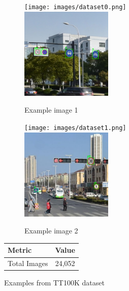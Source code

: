 \documentclass[10pt]{article}
\begin{document}
\begin{figure}[H]
    \centering
    \begin{minipage}{0.45\textwidth}
        \begin{subfigure}{\textwidth}
            \centering
            \texttt{[image: images/dataset0.png]}
            \includegraphics[width=0.48\textwidth]{images/dataset0-enlarged.png}
            \caption{Example image 1}
        \end{subfigure}
        \vspace{0.2cm}
        \begin{subfigure}{\textwidth}
            \centering
            \texttt{[image: images/dataset1.png]}
            \includegraphics[width=0.48\textwidth]{images/dataset1-enlarged.png}
            \caption{Example image 2}
        \end{subfigure}
        \caption{Examples from TT100K dataset}
        \label{fig:examples}
    \end{minipage}
    \hfill
    \begin{minipage}{0.5\textwidth}
        \centering
        \begin{tabular}{lc}
            \toprule
            Metric & Value \\
            \midrule
            Total Images & 24,052 \\

\end{tabular}
\end{minipage}
\end{figure}
\end{document}
